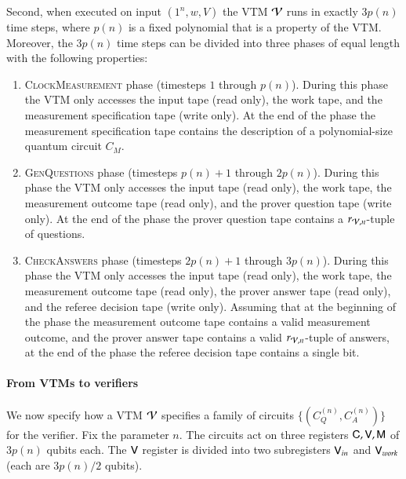 Second, when executed on input $(1^n,w,V)$ the VTM $\mathcal V$ runs in exactly $3p(n)$ time steps, where $p(n)$ is a fixed polynomial that is a property of the VTM. Moreover, the $3p(n)$ time steps can be divided into three phases of equal length with the following properties: 
\begin{enumerate}
\item \textsc{ClockMeasurement} phase (timesteps $1$ through $p(n)$). During this phase the VTM only accesses the input tape (read only), the work tape, and the measurement specification tape (write only). At the end of the phase the measurement specification tape contains the description of a polynomial-size quantum circuit $C_M$.  
\item  \textsc{GenQuestions} phase (timesteps $p(n) +1$ through $2p(n)$). During this phase the VTM only accesses the input tape (read only), the work tape, the measurement outcome tape (read only), and the prover question tape (write only). At the end of the phase the prover question tape contains a $r_{\mathcal V,n}$-tuple of questions. 
\item \textsc{CheckAnswers} phase (timesteps $2p(n) + 1$ through $3p(n)$). During this phase the VTM only accesses the input tape (read only), the work tape, the measurement outcome tape (read only), the prover answer tape (read only), and the referee decision tape (write only). Assuming that at the beginning of the phase the measurement outcome tape contains a valid measurement outcome, and the prover answer tape contains a valid $r_{\mathcal V,n}$-tuple of answers, at the end of the phase the referee decision tape contains a single bit. 
\end{enumerate}

\paragraph{From VTMs to verifiers} We now specify how a VTM $\mathcal V$ specifies a family of circuits $\{ (C_Q^{(n)},C_A^{(n)}) \}$ for the verifier. Fix the parameter $n$. The circuits act on three registers ${\mathsf{C}}, {\mathsf{V}}, {\mathsf{M}}$ of $3p(n)$ qubits each. The ${\mathsf{V}}$ register is divided into two subregisters ${\mathsf{V}}_{in}$ and ${\mathsf{V}}_{work}$ (each are $3p(n)/2$ qubits). 


